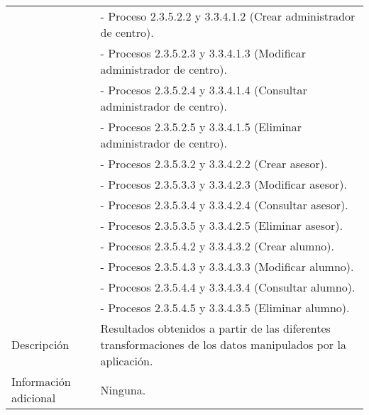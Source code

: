 \begin{center}
\begin{longtable}{| l | p{9cm} |}
                          & - Proceso 2.3.5.2.2 y 3.3.4.1.2 (Crear administrador de centro).\\
                          & - Procesos 2.3.5.2.3 y 3.3.4.1.3 (Modificar administrador de centro).\\
                          & - Procesos 2.3.5.2.4 y 3.3.4.1.4 (Consultar administrador de centro).\\
                          & - Procesos 2.3.5.2.5 y 3.3.4.1.5 (Eliminar administrador de centro).\\
                          & - Procesos 2.3.5.3.2 y 3.3.4.2.2 (Crear asesor).\\
                          & - Procesos 2.3.5.3.3 y 3.3.4.2.3 (Modificar asesor).\\
                          & - Procesos 2.3.5.3.4 y 3.3.4.2.4 (Consultar asesor).\\
                          & - Procesos 2.3.5.3.5 y 3.3.4.2.5 (Eliminar asesor).\\
                          & - Procesos 2.3.5.4.2 y 3.3.4.3.2 (Crear alumno).\\
                          & - Procesos 2.3.5.4.3 y 3.3.4.3.3 (Modificar alumno).\\
                          & - Procesos 2.3.5.4.4 y 3.3.4.3.4 (Consultar alumno).\\
                          & - Procesos 2.3.5.4.5 y 3.3.4.3.5 (Eliminar alumno).\\
    \hline
    Descripción & Resultados obtenidos a partir de las diferentes
                  transformaciones de los datos manipulados por la aplicación.\\
    \hline
    Información adicional & Ninguna.\\
    \hline
  \end{longtable}
\end{center}
